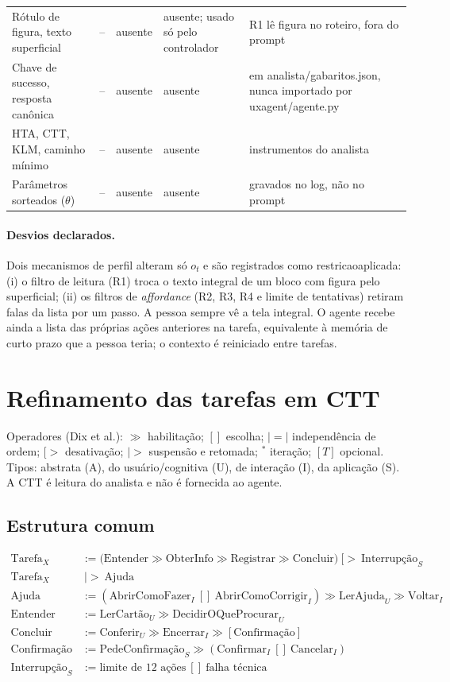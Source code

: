 \documentclass[10pt,a4paper]{article}
\newcommand{\cod}[1]{{\ttfamily\small\def\_{\textunderscore\allowbreak}#1}}
\begin{document}
\begin{longtable}{@{}P{2.6cm}P{1.6cm}P{3.6cm}P{4.2cm}P{3.6cm}@{}}
\midrule
Rótulo de figura, texto superficial & -- & ausente & ausente; usado só pelo controlador & R1 lê \cod{figura} no roteiro, fora do prompt\\
Chave de sucesso, resposta canônica & -- & ausente & ausente & em \cod{analista/gabaritos.json}, nunca importado por \cod{uxagent/agente.py}\\
HTA, CTT, KLM, caminho mínimo & -- & ausente & ausente & instrumentos do analista\\
Parâmetros sorteados ($\theta$) & -- & ausente & ausente & gravados no log, não no prompt\\
\bottomrule
\end{longtable}

\paragraph{Desvios declarados.} Dois mecanismos de perfil alteram só $o_t$ e são registrados como \cod{restricao\_aplicada}: (i) o filtro de leitura (R1) troca o texto integral de um bloco com figura pelo superficial; (ii) os filtros de \emph{affordance} (R2, R3, R4 e limite de tentativas) retiram falas da lista por um passo. A pessoa sempre vê a tela integral. O agente recebe ainda a lista das próprias ações anteriores na tarefa, equivalente à memória de curto prazo que a pessoa teria; o contexto é reiniciado entre tarefas.

\section{Refinamento das tarefas em CTT}
Operadores (Dix et al.): $\gg$ habilitação; $[]$ escolha; $|\!=\!|$ independência de ordem; $[\!>$ desativação; $|\!>$ suspensão e retomada; $^{*}$ iteração; $[T]$ opcional. Tipos: abstrata (A), do usuário/cognitiva (U), de interação (I), da aplicação (S). A CTT é leitura do analista e não é fornecida ao agente.

\subsection{Estrutura comum}
\begin{align*}
\text{Tarefa}_X &:= \big(\text{Entender} \gg \text{ObterInfo} \gg \text{Registrar} \gg \text{Concluir}\big)\ [\!>\ \text{Interrupção}_S\\
\text{Tarefa}_X &\ |\!>\ \text{Ajuda}\\
\text{Ajuda} &:= (\text{AbrirComoFazer}_I\ []\ \text{AbrirComoCorrigir}_I) \gg \text{LerAjuda}_U \gg \text{Voltar}_I\\
\text{Entender} &:= \text{LerCartão}_U \gg \text{DecidirOQueProcurar}_U\\
\text{Concluir} &:= \text{Conferir}_U \gg \text{Encerrar}_I \gg [\text{Confirmação}]\\
\text{Confirmação} &:= \text{PedeConfirmação}_S \gg (\text{Confirmar}_I\ []\ \text{Cancelar}_I)\\
\text{Interrupção}_S &:= \text{limite de 12 ações}\ []\ \text{falha técnica}
\end{align*}
\end{document}
